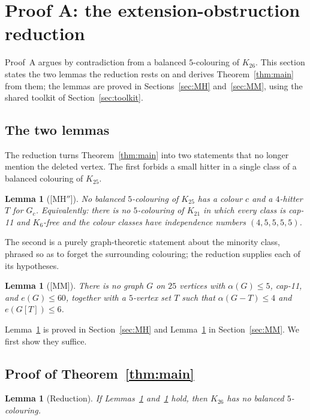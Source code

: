 \documentclass[11pt,reqno]{amsart}
\newtheorem{lemma}[theorem]{Lemma}
\theoremstyle{definition}
\theoremstyle{remark}
\newcommand{\capeleven}{\textsf{cap-11}}
\begin{document}
\section{Proof A: the extension-obstruction reduction}\label{sec:reductionA}
Proof~A argues by contradiction from a balanced $5$-colouring of $K_{26}$. This section
states the two lemmas the reduction rests on and derives Theorem~\ref{thm:main} from
them; the lemmas are proved in Sections~\ref{sec:MH} and~\ref{sec:MM}, using the shared
toolkit of Section~\ref{sec:toolkit}.

\subsection{The two lemmas}
The reduction turns Theorem~\ref{thm:main} into two statements that no longer
mention the deleted vertex. The first forbids a small hitter in a single class of a
balanced colouring of $K_{25}$.

\begin{lemma}[\textsf{[MH$''$]}]\label{lem:MH}
No balanced $5$-colouring of $K_{25}$ has a colour $c$ and a $4$-hitter $T$ for
$G_c$. Equivalently: there is no $5$-colouring of $K_{21}$ in which every class is
\capeleven{} and $K_6$-free and the colour classes have independence numbers
$(4,5,5,5,5)$.
\end{lemma}

The second is a purely graph-theoretic statement about the minority class, phrased
so as to forget the surrounding colouring; the reduction supplies each of its
hypotheses.

\begin{lemma}[\textsf{[MM]}]\label{lem:MM}
There is no graph $G$ on $25$ vertices with $\alpha(G)\le 5$, \capeleven, and
$e(G)\le 60$, together with a $5$-vertex set $T$ such that $\alpha(G-T)\le 4$ and
$e(G[T])\le 6$.
\end{lemma}

Lemma~\ref{lem:MH} is proved in Section~\ref{sec:MH} and Lemma~\ref{lem:MM} in
Section~\ref{sec:MM}. We first show they suffice.

\subsection{Proof of Theorem~\ref{thm:main}}
\begin{lemma}[Reduction]\label{lem:chain}
If Lemmas~\ref{lem:MH} and~\ref{lem:MM} hold, then $K_{26}$ has no balanced
$5$-colouring.
\end{lemma}
\end{document}
